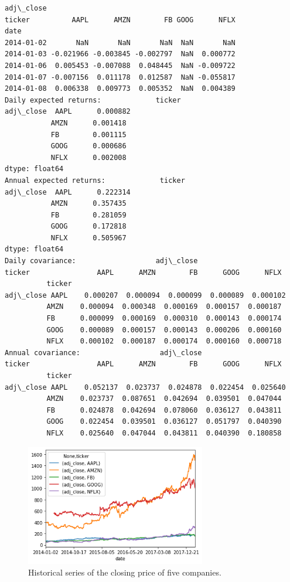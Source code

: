 \begin{tcolorbox}[breakable, size=fbox, boxrule=1pt, pad at break*=1mm,colback=cellbackground, colframe=cellborder]
\begin{Verbatim}[commandchars=\\\{\}]
           adj\_close
ticker          AAPL      AMZN        FB GOOG      NFLX
date
2014-01-02       NaN       NaN       NaN  NaN       NaN
2014-01-03 -0.021966 -0.003845 -0.002797  NaN  0.000772
2014-01-06  0.005453 -0.007088  0.048445  NaN -0.009722
2014-01-07 -0.007156  0.011178  0.012587  NaN -0.055817
2014-01-08  0.006338  0.009773  0.005352  NaN  0.004389
Daily expected returns:             ticker
adj\_close  AAPL      0.000882
           AMZN      0.001418
           FB        0.001115
           GOOG      0.000686
           NFLX      0.002008
dtype: float64
Annual expected returns:             ticker
adj\_close  AAPL      0.222314
           AMZN      0.357435
           FB        0.281059
           GOOG      0.172818
           NFLX      0.505967
dtype: float64
Daily covariance:                   adj\_close
ticker                AAPL      AMZN        FB      GOOG      NFLX
          ticker
adj\_close AAPL    0.000207  0.000094  0.000099  0.000089  0.000102
          AMZN    0.000094  0.000348  0.000169  0.000157  0.000187
          FB      0.000099  0.000169  0.000310  0.000143  0.000174
          GOOG    0.000089  0.000157  0.000143  0.000206  0.000160
          NFLX    0.000102  0.000187  0.000174  0.000160  0.000718
Annual covariance:                   adj\_close
ticker                AAPL      AMZN        FB      GOOG      NFLX
          ticker
adj\_close AAPL    0.052137  0.023737  0.024878  0.022454  0.025640
          AMZN    0.023737  0.087651  0.042694  0.039501  0.047044
          FB      0.024878  0.042694  0.078060  0.036127  0.043811
          GOOG    0.022454  0.039501  0.036127  0.051797  0.040390
          NFLX    0.025640  0.047044  0.043811  0.040390  0.180858
    \end{Verbatim}
\end{tcolorbox}

    \begin{figure}
    \centering
    \includegraphics[width=0.7\textwidth]{figures/markowitz_4_1.png}
    \caption{Historical series of the closing price of five companies.}
    \label{fig:stocks}
    \end{figure}
    
